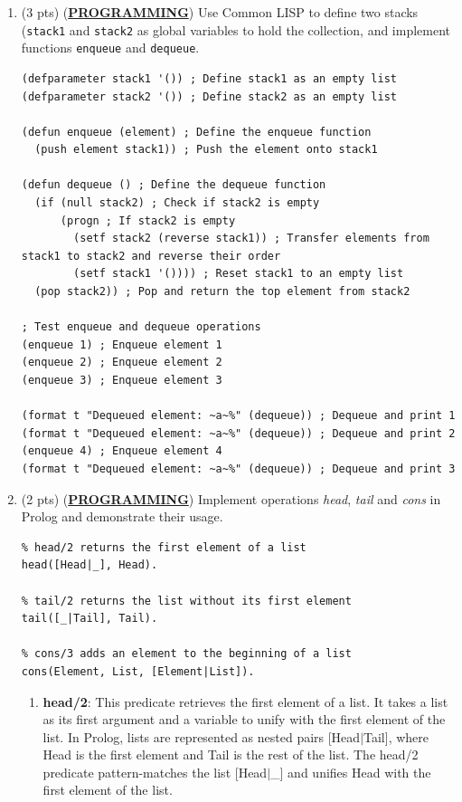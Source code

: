 \documentclass[12pt]{article}
\begin{document}
\begin{spacing}{1.5}
\begin{enumerate}
		\item (3 pts) (\textbf{\uline{PROGRAMMING}}) Use Common LISP to define two stacks (\texttt{stack1} and \texttt{stack2} as global variables to hold the collection, and implement functions \texttt{enqueue} and \texttt{dequeue}.
		      		      		      		      
		      \begin{lstlisting}
(defparameter stack1 '()) ; Define stack1 as an empty list
(defparameter stack2 '()) ; Define stack2 as an empty list

(defun enqueue (element) ; Define the enqueue function
  (push element stack1)) ; Push the element onto stack1

(defun dequeue () ; Define the dequeue function
  (if (null stack2) ; Check if stack2 is empty
      (progn ; If stack2 is empty
        (setf stack2 (reverse stack1)) ; Transfer elements from stack1 to stack2 and reverse their order
        (setf stack1 '()))) ; Reset stack1 to an empty list
  (pop stack2)) ; Pop and return the top element from stack2

; Test enqueue and dequeue operations
(enqueue 1) ; Enqueue element 1
(enqueue 2) ; Enqueue element 2
(enqueue 3) ; Enqueue element 3

(format t "Dequeued element: ~a~%" (dequeue)) ; Dequeue and print 1
(format t "Dequeued element: ~a~%" (dequeue)) ; Dequeue and print 2
(enqueue 4) ; Enqueue element 4
(format t "Dequeued element: ~a~%" (dequeue)) ; Dequeue and print 3
		      \end{lstlisting}
		      		      		      		              
		\item (2 pts) (\textbf{\uline{PROGRAMMING}}) Implement operations \textit{head}, \textit{tail} and \textit{cons} in Prolog and demonstrate their usage.
		      		      		      		      
		      \begin{lstlisting}
% head/2 returns the first element of a list
head([Head|_], Head).

% tail/2 returns the list without its first element
tail([_|Tail], Tail).

% cons/3 adds an element to the beginning of a list
cons(Element, List, [Element|List]).
		      \end{lstlisting}
		      		      		      
		      \begin{enumerate}
		      	\item \textbf{head/2}: This predicate retrieves the first element of a list. It takes a list as its first argument and a variable to unify with the first element of the list. In Prolog, lists are represented as nested pairs [Head$|$Tail], where Head is the first element and Tail is the rest of the list. The head/2 predicate pattern-matches the list [Head$|$\_] and unifies Head with the first element of the list.
		      	      		      	      		      	      

\end{enumerate}
\end{enumerate}
\end{spacing}
\end{document}
